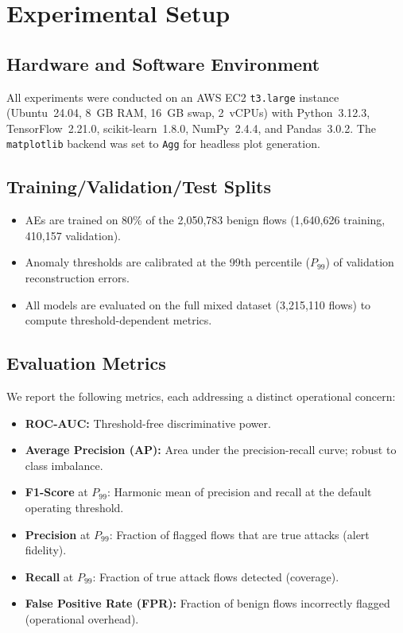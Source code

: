 \documentclass[10pt,journal,compsoc]{IEEEtran}
\begin{document}
\section{Experimental Setup}
\label{sec:exp}

\subsection{Hardware and Software Environment}

All experiments were conducted on an AWS EC2 \texttt{t3.large}
instance (Ubuntu~24.04, 8~GB RAM, 16~GB swap, 2~vCPUs) with
Python~3.12.3, TensorFlow~2.21.0, scikit-learn~1.8.0, NumPy~2.4.4,
and Pandas~3.0.2.  The \texttt{matplotlib} backend was set to
\texttt{Agg} for headless plot generation.

\subsection{Training/Validation/Test Splits}

\begin{itemize}[leftmargin=*,noitemsep]
  \item AEs are trained on 80\% of the 2{,}050{,}783 benign flows
        (1{,}640{,}626 training, 410{,}157 validation).
  \item Anomaly thresholds are calibrated at the 99th percentile
        ($P_{99}$) of validation reconstruction errors.
  \item All models are evaluated on the full mixed dataset
        (3{,}215{,}110 flows) to compute threshold-dependent metrics.
\end{itemize}

\subsection{Evaluation Metrics}

We report the following metrics, each addressing a distinct operational
concern:

\begin{itemize}[leftmargin=*,noitemsep]
  \item \textbf{ROC-AUC:} Threshold-free discriminative power.
  \item \textbf{Average Precision (AP):} Area under the
        precision-recall curve; robust to class imbalance.
  \item \textbf{F1-Score} at $P_{99}$: Harmonic mean of precision
        and recall at the default operating threshold.
  \item \textbf{Precision} at $P_{99}$: Fraction of flagged flows
        that are true attacks (alert fidelity).
  \item \textbf{Recall} at $P_{99}$: Fraction of true attack flows
        detected (coverage).
  \item \textbf{False Positive Rate (FPR):} Fraction of benign flows
        incorrectly flagged (operational overhead).
\end{itemize}
\end{document}
